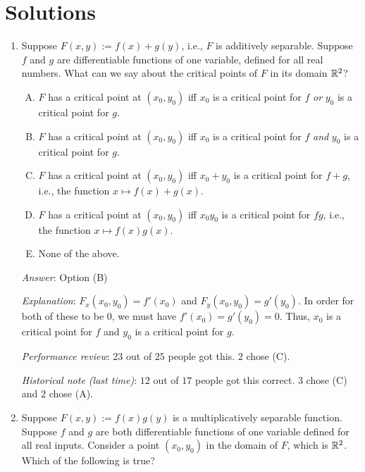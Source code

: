 \documentclass[10pt]{amsart}
\begin{document}
\section{Solutions}
\begin{enumerate}
\item Suppose $F(x,y) := f(x) + g(y)$, i.e., $F$ is additively
  separable. Suppose $f$ and $g$ are differentiable functions of one
  variable, defined for all real numbers. What can we say about the
  critical points of $F$ in its domain $\mathbb{R}^2$?

  \begin{enumerate}[(A)]
  \item $F$ has a critical point at $(x_0,y_0)$ iff $x_0$ is a
    critical point for $f$ {\em or} $y_0$ is a critical point for $g$.
  \item $F$ has a critical point at $(x_0,y_0)$ iff $x_0$ is a
    critical point for $f$ {\em and} $y_0$ is a critical point for
    $g$.
  \item $F$ has a critical point at $(x_0,y_0)$ iff $x_0 + y_0$ is a
    critical point for $f + g$, i.e., the function $x \mapsto f(x) +
    g(x)$.
  \item $F$ has a critical point at $(x_0,y_0)$ iff $x_0y_0$ is a
    critical point for $fg$, i.e., the function $x \mapsto f(x)g(x)$.
  \item None of the above.
  \end{enumerate}

  {\em Answer}: Option (B)

  {\em Explanation}: $F_x(x_0,y_0) = f'(x_0)$ and $F_y(x_0,y_0) =
  g'(y_0)$. In order for both of these to be $0$, we must have
  $f'(x_0) = g'(y_0) = 0$. Thus, $x_0$ is a critical point for $f$ and
  $y_0$ is a critical point for $g$.

  {\em Performance review}: $23$ out of $25$ people got this. $2$
  chose (C).
 
  {\em Historical note (last time)}: $12$ out of $17$ people got this
  correct. $3$ chose (C) and $2$ chose (A).

\item Suppose $F(x,y) := f(x)g(y)$ is a multiplicatively separable
  function. Suppose $f$ and $g$ are both differentiable functions of
  one variable defined for all real inputs. Consider a point
  $(x_0,y_0)$ in the domain of $F$, which is $\mathbb{R}^2$. Which of the
  following is true?


\end{enumerate}
\end{document}
